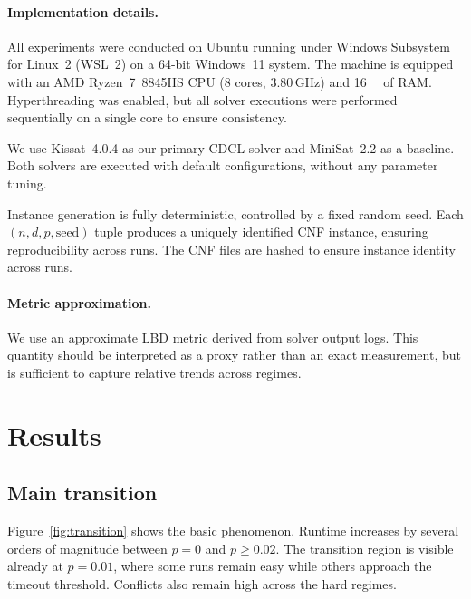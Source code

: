 \documentclass[11pt]{article}
\begin{document}
\paragraph{Implementation details.}
All experiments were conducted on Ubuntu running under Windows Subsystem for Linux~2 (WSL~2) on a 64-bit Windows~11 system. 
The machine is equipped with an AMD Ryzen~7~8845HS CPU (8 cores, 3.80\,GHz) and \SI{16}{\giga\byte} of RAM. 
Hyperthreading was enabled, but all solver executions were performed sequentially on a single core to ensure consistency.

We use Kissat~4.0.4 as our primary CDCL solver and MiniSat~2.2 as a baseline. 
Both solvers are executed with default configurations, without any parameter tuning.

Instance generation is fully deterministic, controlled by a fixed random seed. 
Each $(n, d, p, \text{seed})$ tuple produces a uniquely identified CNF instance, ensuring reproducibility across runs.
The CNF files are hashed to ensure instance identity across runs.

\paragraph{Metric approximation.}
We use an approximate LBD metric derived from solver output logs. This quantity should be interpreted as a proxy rather than an exact measurement, but is sufficient to capture relative trends across regimes.

\section{Results}

\subsection{Main transition}

Figure~\ref{fig:transition} shows the basic phenomenon. Runtime increases by several orders of magnitude between $p=0$ and $p \geq 0.02$. The transition region is visible already at $p=0.01$, where some runs remain easy while others approach the timeout threshold. Conflicts also remain high across the hard regimes.
\end{document}
